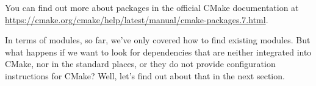 You can find out more about packages in the official CMake documentation at \url{https://cmake.org/cmake/help/latest/manual/cmake-packages.7.html}.

In terms of modules, so far, we've only covered how to find existing modules. But what happens if we want to look for dependencies that are neither integrated into CMake, nor in the standard places, or they do not provide configuration instructions for CMake? Well, let's find out about that in the next section.





